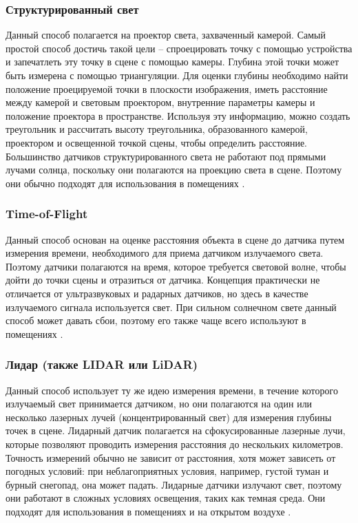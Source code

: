 \subsubsection*{Структурированный свет}

Данный способ полагается на проектор света, захваченный камерой. Самый простой способ достичь такой цели -- спроецировать точку с помощью устройства и запечатлеть эту точку в сцене с помощью камеры. Глубина этой точки может быть измерена с помощью триангуляции. Для оценки глубины необходимо найти положение проецируемой точки в плоскости изображения, иметь расстояние между камерой и световым проектором, внутренние параметры камеры и положение проектора в пространстве. Используя эту информацию, можно создать треугольник и рассчитать высоту треугольника, образованного камерой, проектором и освещенной точкой сцены, чтобы определить расстояние. Большинство датчиков структурированного света не работают под прямыми лучами солнца, поскольку они полагаются на проекцию света в сцене. Поэтому они обычно подходят для использования в помещениях \cite{rgbd}.

\subsubsection*{Time-of-Flight}

Данный способ основан на оценке расстояния объекта в сцене до датчика путем измерения времени, необходимого для приема датчиком излучаемого света. Поэтому датчики полагаются на время, которое требуется световой волне, чтобы дойти до точки сцены и отразиться от датчика. Концепция практически не отличается от ультразвуковых и радарных датчиков, но здесь в качестве излучаемого сигнала используется свет. При сильном солнечном свете данный способ может давать сбои, поэтому его также чаще всего используют в помещениях \cite{rgbd}.

\subsubsection*{Лидар (также LIDAR или LiDAR)}

Данный способ использует ту же идею измерения времени, в течение которого излучаемый свет принимается датчиком, но они полагаются на один или несколько лазерных лучей (концентрированный свет) для измерения глубины точек в сцене. Лидарный датчик полагается на сфокусированные лазерные лучи, которые позволяют проводить измерения расстояния до нескольких километров. Точность измерений обычно не зависит от расстояния, хотя может зависеть от погодных условий: при неблагоприятных условия, например, густой туман и бурный снегопад, она может падать. Лидарные датчики излучают свет, поэтому они работают в сложных условиях освещения, таких как темная среда. Они подходят для использования в помещениях и на открытом воздухе \cite{rgbd}.

